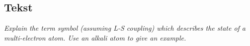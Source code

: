 \subsection{Tekst}

\emph{Explain the term symbol (assuming L-S coupling) which describes the state of a multi-electron atom. Use an alkali atom to give an example.}